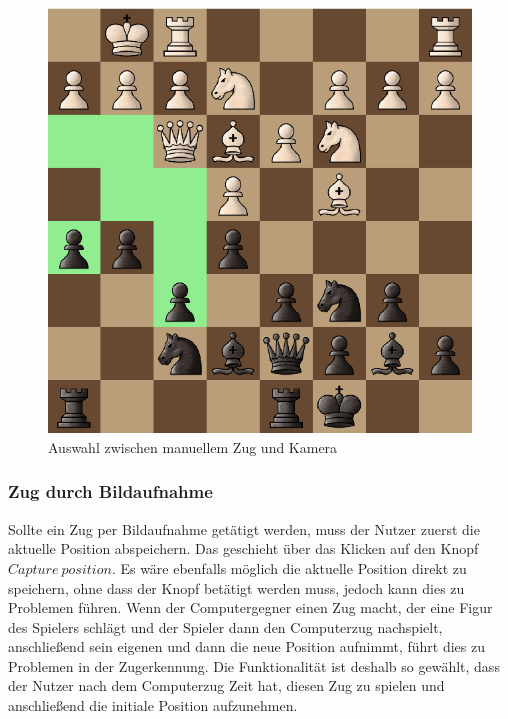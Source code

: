 \begin{figure}[H]
    \centering
    \includegraphics[scale=0.5]{images/manual_input.png}
    \caption{Auswahl zwischen manuellem Zug und Kamera}
\end{figure} 

\subsubsection{Zug durch Bildaufnahme}
Sollte ein Zug per Bildaufnahme getätigt werden, muss der Nutzer zuerst die aktuelle Position abspeichern. 
Das geschieht über das Klicken auf den Knopf \(Capture~position\). Es wäre ebenfalls möglich die aktuelle Position direkt zu speichern, ohne dass der Knopf
betätigt werden muss, jedoch kann dies zu Problemen führen. Wenn der Computergegner einen Zug macht, der eine Figur des Spielers schlägt und der Spieler dann 
den Computerzug nachspielt, anschließend sein eigenen und dann die neue Position aufnimmt, führt dies zu Problemen in der Zugerkennung.
Die Funktionalität ist deshalb so gewählt, dass der Nutzer nach dem Computerzug Zeit hat, diesen Zug zu spielen und anschließend die initiale Position aufzunehmen.

